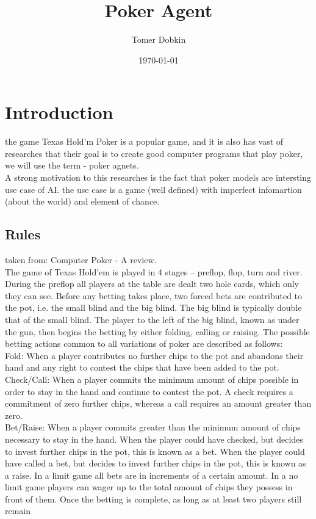 \documentclass{article}
\title{Poker Agent}
\author{Tomer Dobkin}
\date{\today}
\begin{document}
\maketitle
\section{Introduction}
the game Texas Hold'm Poker is a popular game, and it is also has vast of researches that their goal is to create good computer programs that play poker, we will use the term -  poker agnets.\\
A strong motivation to this researches is the fact that  poker models are intersting use case of AI. the use case is a game (well defined) with imperfect infomartion (about the world) and element of chance.
\subsection{Rules}
taken from: Computer Poker - A review.\\
The game of Texas Hold’em is played in 4 stages – preflop, flop, turn and river. During the preflop all players at the
table are dealt two hole cards, which only they can see. Before any betting takes place, two forced bets are contributed to
the pot, i.e. the small blind and the big blind. The big blind is typically double that of the small blind. The player to the left
of the big blind, known as under the gun, then begins the betting by either folding, calling or raising. The possible betting
actions common to all variations of poker are described as follows:\\
Fold: When a player contributes no further chips to the pot and abandons their hand and any right to contest the chips
that have been added to the pot.\\
Check/Call: When a player commits the minimum amount of chips possible in order to stay in the hand and continue to
contest the pot. A check requires a commitment of zero further chips, whereas a call requires an amount greater
than zero.\\
Bet/Raise: When a player commits greater than the minimum amount of chips necessary to stay in the hand. When the
player could have checked, but decides to invest further chips in the pot, this is known as a bet. When the player
could have called a bet, but decides to invest further chips in the pot, this is known as a raise.
In a limit game all bets are in increments of a certain amount. In a no limit game players can wager up to the total
amount of chips they possess in front of them. Once the betting is complete, as long as at least two players still remain
\end{document}
